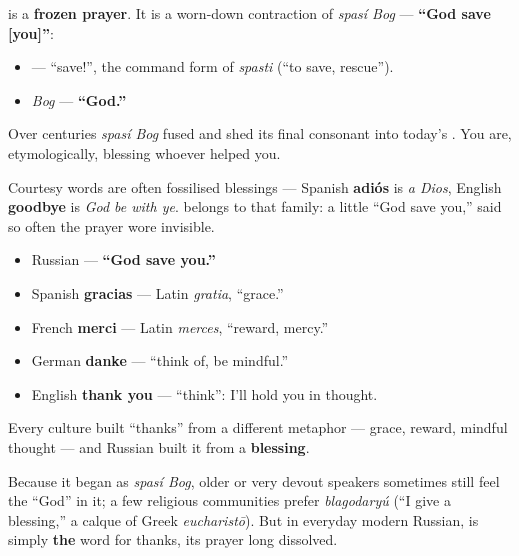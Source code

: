 \begin{cousinweb}
\textbf{} is a \textbf{frozen prayer}. It is a worn-down contraction of \emph{spasí Bog} — \textbf{\textquotedblleft{}God save {[}you{]}\textquotedblright{}}:

\begin{itemize}
\raggedright
  \item \textbf{} — \textquotedblleft{}save!\textquotedblright{}, the command form of \emph{spasti} (\textquotedblleft{}to save, rescue\textquotedblright{}).
  \item \emph{Bog} — \textbf{\textquotedblleft{}God.\textquotedblright{}}
\end{itemize}

Over centuries \emph{spasí Bog} fused and shed its final consonant into today's \emph{}. You are, etymologically, blessing whoever helped you.

Courtesy words are often fossilised blessings — Spanish \textbf{adiós} is \emph{a Dios}, English \textbf{goodbye} is \emph{God be with ye}. \emph{} belongs to that family: a little \textquotedblleft{}God save you,\textquotedblright{} said so often the prayer wore invisible.
\end{cousinweb}

\begin{cousinweb}
\begin{itemize}
\raggedright
  \item Russian \textbf{} — \textbf{\textquotedblleft{}God save you.\textquotedblright{}}
  \item Spanish \textbf{gracias} — Latin \emph{gratia}, \textquotedblleft{}grace.\textquotedblright{}
  \item French \textbf{merci} — Latin \emph{merces}, \textquotedblleft{}reward, mercy.\textquotedblright{}
  \item German \textbf{danke} — \textquotedblleft{}think of, be mindful.\textquotedblright{}
  \item English \textbf{thank you} — \textquotedblleft{}think\textquotedblright{}: I'll hold you in thought.
\end{itemize}

Every culture built \textquotedblleft{}thanks\textquotedblright{} from a different metaphor — grace, reward, mindful thought — and Russian built it from a \textbf{blessing}.
\end{cousinweb}

\begin{culture}
Because it began as \emph{spasí Bog}, older or very devout speakers sometimes still feel the \textquotedblleft{}God\textquotedblright{} in it; a few religious communities prefer \emph{blagodaryú} (\textquotedblleft{}I give a blessing,\textquotedblright{} a calque of Greek \emph{eucharistō}). But in everyday modern Russian, \emph{} is simply \textbf{the} word for thanks, its prayer long dissolved.
\end{culture}

